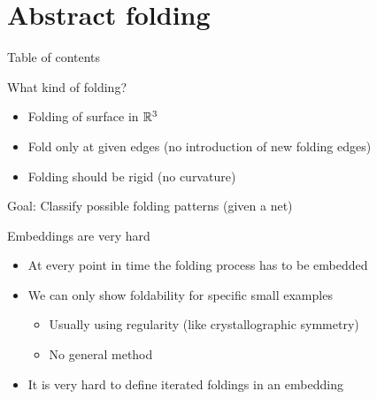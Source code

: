 \section{Abstract folding}
\begin{frame}{Table of contents}
    \tableofcontents[currentsection]
\end{frame}

\begin{frame}{What kind of folding?}
    \begin{itemize}
        \pause
        \item Folding of surface in $\mathbb{R}^3$
        \pause
        \item Fold only at given edges (no introduction of new folding edges)
        \pause
        \item Folding should be rigid (no curvature)
    \end{itemize}

    \pause
    Goal: Classify possible folding patterns (given a net)

    \pause
    \begin{center}
    \end{center}

\end{frame}


\begin{frame}{Embeddings are very hard}
    \begin{itemize}
        \item<2-> At every point in time the folding process has to be embedded
        \item<3-> We can only show foldability for specific small examples
            \begin{itemize}
                \item<4-> Usually using regularity (like crystallographic symmetry)
                \item<5-> No general method
            \end{itemize}
        \item<6-> It is very hard to define iterated foldings in an embedding
    \end{itemize}

    \begin{center}
    \end{center}

\end{frame}


